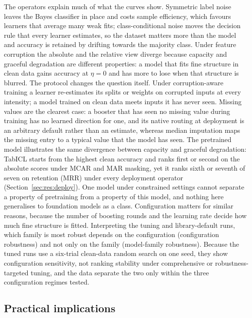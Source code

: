\documentclass[pdflatex,sn-mathphys]{sn-jnl}
\theoremstyle{thmstyleone}
\theoremstyle{thmstyletwo}
\theoremstyle{thmstylethree}
\begin{document}
The operators explain much of what the curves show. Symmetric label noise leaves the Bayes classifier in place and costs sample efficiency, which favours learners that average many weak fits; class-conditional noise moves the decision rule that every learner estimates, so the dataset matters more than the model and accuracy is retained by drifting towards the majority class. Under feature corruption the absolute and the relative view diverge because capacity and graceful degradation are different properties: a model that fits fine structure in clean data gains accuracy at $\eta=0$ and has more to lose when that structure is blurred. The protocol changes the question itself. Under corruption-aware training a learner re-estimates its splits or weights on corrupted inputs at every intensity; a model trained on clean data meets inputs it has never seen. Missing values are the clearest case: a booster that has seen no missing value during training has no learned direction for one, and its native routing at deployment is an arbitrary default rather than an estimate, whereas median imputation maps the missing entry to a typical value that the model has seen. The pretrained model illustrates the same divergence between capacity and graceful degradation: TabICL starts from the highest clean accuracy and ranks first or second on the absolute scores under MCAR and MAR masking, yet it ranks sixth or seventh of seven on retention (MRR) under every deployment operator (Section~\ref{sec:res:deploy}). One model under constrained settings cannot separate a property of pretraining from a property of this model, and nothing here generalises to foundation models as a class. Configuration matters for similar reasons, because the number of boosting rounds and the learning rate decide how much fine structure is fitted. Interpreting the tuning and library-default runs, which family is most robust depends on the configuration (configuration robustness) and not only on the family (model-family robustness). Because the tuned runs use a six-trial clean-data random search on one seed, they show configuration sensitivity, not ranking stability under comprehensive or robustness-targeted tuning, and the data separate the two only within the three configuration regimes tested.

\subsection{Practical implications}\label{sec:disc:practice}
\end{document}
